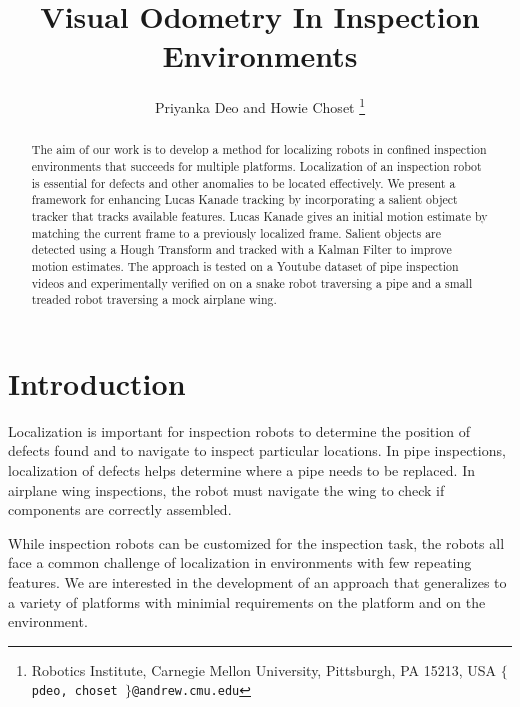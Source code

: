\documentclass[letterpaper, 10 pt, conference]{ieeeconf}
\title{\LARGE \bf Visual Odometry In Inspection Environments}
\author{Priyanka Deo and Howie Choset%
\thanks{Robotics Institute,
Carnegie Mellon University,
Pittsburgh, PA 15213, USA
{\tt\small $\lbrace$ pdeo, choset $\rbrace$@andrew.cmu.edu}}%
}
\begin{document}
\maketitle
\thispagestyle{empty}
\pagestyle{empty}


\begin{abstract}

The aim of our work is to develop a method for localizing robots in confined inspection environments that succeeds for multiple platforms. Localization of an inspection robot is essential for defects and other anomalies to be located effectively. We present a framework for enhancing Lucas Kanade tracking by incorporating a salient object tracker that tracks available features. Lucas Kanade gives an initial motion estimate by matching the current frame to a previously localized frame. Salient objects are detected using a Hough Transform and tracked with a Kalman Filter to improve motion estimates. The approach is tested on a Youtube dataset of pipe inspection videos and experimentally verified on on a snake robot traversing a pipe and a small treaded robot traversing a mock airplane wing.

\end{abstract}



\section{Introduction}

Localization is important for inspection robots to determine the position of defects found and to navigate to inspect particular locations. In pipe inspections, localization of defects helps determine where a pipe needs to be replaced. In airplane wing inspections, the robot must navigate the wing to check if components are correctly assembled.

While inspection robots can be customized for the inspection task, the robots all face a common challenge of localization in environments with few repeating features. We are interested in the development of an approach that generalizes to a variety of platforms with minimial requirements on the platform and on the environment.
\end{document}

